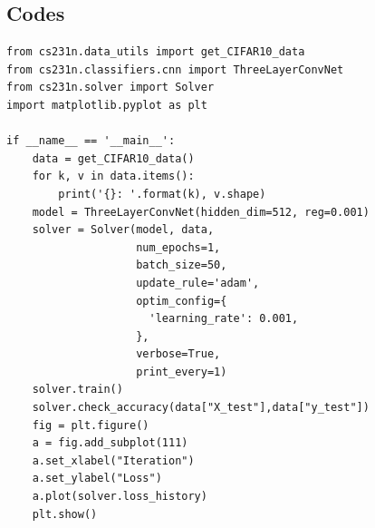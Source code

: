 \documentclass[a4paper, 11pt]{article}
\begin{document}
\subsection{Codes}
\begin{lstlisting}
from cs231n.data_utils import get_CIFAR10_data
from cs231n.classifiers.cnn import ThreeLayerConvNet
from cs231n.solver import Solver
import matplotlib.pyplot as plt

if __name__ == '__main__':
    data = get_CIFAR10_data()
    for k, v in data.items():
        print('{}: '.format(k), v.shape)
    model = ThreeLayerConvNet(hidden_dim=512, reg=0.001)
    solver = Solver(model, data,
                    num_epochs=1,
                    batch_size=50,
                    update_rule='adam',
                    optim_config={
                      'learning_rate': 0.001,
                    },
                    verbose=True,
                    print_every=1)
    solver.train()
    solver.check_accuracy(data["X_test"],data["y_test"])
    fig = plt.figure()
    a = fig.add_subplot(111)
    a.set_xlabel("Iteration")
    a.set_ylabel("Loss")
    a.plot(solver.loss_history)
    plt.show()
\end{lstlisting}
\end{document}
